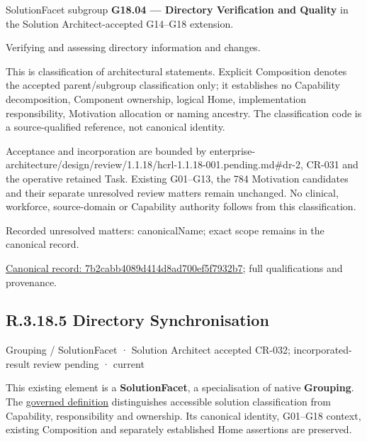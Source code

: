SolutionFacet subgroup \textbf{G18.04 — Directory Verification and Quality} in the Solution Architect-accepted G14–G18 extension.



Verifying and assessing directory information and changes.



This is classification of architectural statements. Explicit Composition denotes the accepted parent/subgroup classification only; it establishes no Capability decomposition, Component ownership, logical Home, implementation responsibility, Motivation allocation or naming ancestry. The classification code is a source-qualified reference, not canonical identity.



Acceptance and incorporation are bounded by enterprise-architecture/design/review/1.1.18/hcrl-1.1.18-001.pending.md\#dr-2, CR-031 and the operative retained Task. Existing G01–G13, the 784 Motivation candidates and their separate unresolved review matters remain unchanged. No clinical, workforce, source-domain or Capability authority follows from this classification.


{\small Recorded unresolved matters: canonicalName; exact scope remains in the canonical record.}\par
{\footnotesize \href{../../../../../../../continuum/grouping/7b2cabb4089d414d8ad700ef5f7932b7.md}{Canonical record: 7b2cabb4089d414d8ad700ef5f7932b7}; full qualifications and provenance.}\par
\subsection*{R.3.18.5 Directory Synchronisation}
\label{navigation:R.3.18.5}

\label{element:e1ed88f315a84116a77ead21d8fe1792}
{\small Grouping / SolutionFacet · Solution Architect accepted CR-032; incorporated-result review pending · current}\par

This existing element is a \textbf{SolutionFacet}, a specialisation of native
\textbf{Grouping}. The \href{\detokenize{../../../../../../../governance/continuum-representation.md#solutionfacet-classification--1119-candidate}}{governed definition}
distinguishes accessible solution classification from Capability, responsibility
and ownership. Its canonical identity, G01–G18 context, existing Composition
and separately established Home assertions are preserved.



